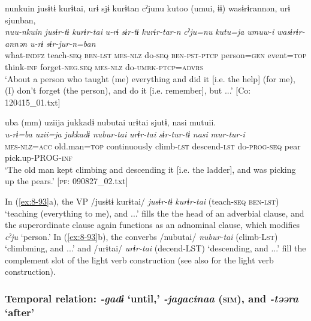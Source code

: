\ea
{\TM}
\glll  nunkuin  jusɨtɨ  kurɨtai,  urɨ  sjɨ  kurɨtan      cˀjunu  kutoo  (umui,  ɨɨ)  wasɨrɨrannən,  urɨ      sjunban,\\
\textit{nuu-nkuin}  \textit{jusɨr-tɨ}  \textit{kurɨr-tai}  \textit{u-rɨ}  \textit{sɨr-tɨ}  \textit{kurɨr-tar-n}      \textit{cˀju=nu}  \textit{kutu=ja}  \textit{umuw-i}    \textit{wasɨrɨr-annən}  \textit{u-rɨ}      \textit{sɨr-jur-n=ban}\\
what-\textsc{indfz}  teach-\textsc{seq}  \textsc{ben}-\textsc{lst}  \textsc{mes}-\textsc{nlz}  do-\textsc{seq}  \textsc{ben}-\textsc{pst}-\textsc{ptcp}   person=\textsc{gen}  event=\textsc{top}  think-\textsc{inf}    forget-\textsc{neg}.\textsc{seq}  \textsc{mes}-\textsc{nlz} do-\textsc{umrk}-\textsc{ptcp}=\textsc{advrs}\\
\glt ‘About a person who taught (me) everything and did it [i.e. the help] (for me), (I) don’t forget (the person), and do it [i.e. remember], but ...’ [Co: 120415\_01.txt]

\ex
{\TM}
\glll  uba{\footnotemark} (mm)  uziija  jukkadɨ  nubutai    urɨtai  sjutɨ,  nasi  mutuii.\\
\textit{u-rɨ=ba}    \textit{uzii=ja}  \textit{jukkadɨ}  \textit{nubur-tai}  \textit{urɨr-tai}  \textit{sɨr-tur-tɨ}  \textit{nasi}  \textit{mur-tur-i}\\
\textsc{mes}-\textsc{nlz}=\textsc{acc}    old.man=\textsc{top}  continuously  climb-\textsc{lst}  descend-\textsc{lst}  do-\textsc{prog}-\textsc{seq}  pear  pick.up-PROG-\textsc{inf}\\
\glt ‘The old man kept climbing and descending it [i.e. the ladder], and was picking up the pears.’ [\textsc{pf}: 090827\_02.txt]
\z

In (\ref{ex:8-93}a), the VP /jusɨtɨ kurɨtai/ \textit{jusɨr-tɨ} \textit{kurɨr-tai} (teach-\textsc{seq} \textsc{ben}-\textsc{lst}) ‘teaching (everything to me), and ...’ fills the the head of an adverbial clause, and the superordinate clause again functions as an adnominal clause, which modifies \textit{cˀju} ‘person.’ In (\ref{ex:8-93}b), the converbs /nubutai/ \textit{nubur-tai} (climb-L\textsc{st}) ‘climbming, and ...’ and /urɨtai/ \textit{urɨr-tai} (decend-LST) ‘descending, and ...’ fill the complement slot of the light verb construction (see also  for the light verb construction).

\subsubsection{Temporal relation: \textit{-gadɨ} ‘until,’ \textit{-jagacinaa} (\textsc{sim}), and \textit{-təəra} ‘after’}

